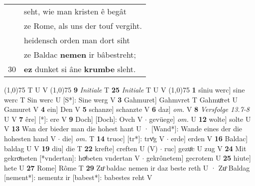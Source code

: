 \documentclass[8pt,a4paper,notitlepage]{article}
\begin{document}
\begin{table}[ht]
\begin{minipage}[t]{0.5\linewidth}
\begin{tabular}{rl}
 & seht, wie man kristen ê begât\\ 
 & ze Rome, als uns der touf vergiht.\\ 
 & heidensch orden man dort siht\\ 
 & ze Baldac \textbf{nemen} ir bâbestreht;\\ 
30 & \textbf{ez} dunket si âne \textbf{krumbe} sleht.\\ 
\end{tabular}
\scriptsize
\line(1,0){75} \newline
T U V \newline
\line(1,0){75} \newline
\textbf{9} \textit{Initiale} T  \textbf{25} \textit{Initiale} T U V  \newline
\line(1,0){75} \newline
\textbf{1} sîniu werc] sine werc T Sin werc U [S*]: Sine werg V \textbf{3} Gahmuret] Gahmvret T Gahmuͦret U Gamuret V \textbf{4} ein] Den V \textbf{5} schanze] schanzte V \textbf{6} daz] \textit{om.} V \textbf{8} \textit{Versfolge 13.7-8} U V  \textbf{7} êre] [*]: ere V \textbf{9} Doch] [Doch]: Ovch V  $\cdot$ gevüege] \textit{om.} U \textbf{12} wolte] solte U V \textbf{13} Wan der bieder man die hohest hant U · [Wand*]: Wande eines der die hohesten hand V  $\cdot$ die] \textit{om.} T \textbf{14} truoc] [tr*]: trvͤg V  $\cdot$ erde] erden V \textbf{16} Baldac] baldag U V \textbf{19} diu] die T \textbf{22} krefte] creften U (V)  $\cdot$ ruc] gezuͦc U zug V \textbf{24} Mit gekroͤneten [*vndertan]: hoͮbeten vndertan V  $\cdot$ gekrônetem] gecrotem U \textbf{25} hiute] hete U \textbf{27} Rome] Rôme T \textbf{29} Zuͦ baldac nemen ir daz beste reth U · Zuͦ Baldag [nement*]: nementz ir [babest*]: babestes reht V \newline
\end{minipage}
\end{table}
\end{document}
